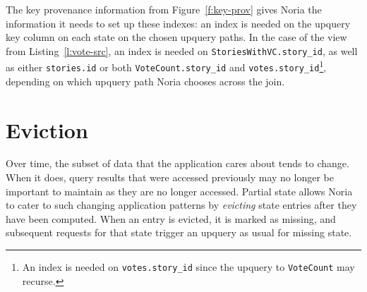 The key provenance information from Figure~\ref{f:key-prov} gives Noria the
information it needs to set up these indexes: an index is needed on the upquery
key column on each state on the chosen upquery paths. In the case of the view
from Listing~\ref{l:vote-src}, an index is needed on
\texttt{StoriesWithVC.story\_id}, as well as either \texttt{stories.id} or both
\texttt{VoteCount.story\_id} and \texttt{votes.story\_id}\footnote{An index is
needed on \texttt{votes.story\_id} since the upquery to \texttt{VoteCount} may
recurse.}, depending on which upquery path Noria chooses across the join.

\section{Eviction}
\label{s:eviction}

Over time, the subset of data that the application cares about tends to change.
When it does, query results that were accessed previously may no longer be
important to maintain as they are no longer accessed. Partial state allows Noria
to cater to such changing application patterns by \textit{evicting} state
entries after they have been computed. When an entry is evicted, it is marked as
missing, and subsequent requests for that state trigger an upquery as usual for
missing state.
